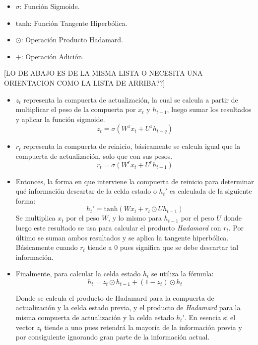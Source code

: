 \documentclass[12pt, letterpaper]{article}
\begin{document}
    \begin{itemize}
        \item $\sigma$: Función Sigmoide.
        \item $\text{tanh}$: Función Tangente Hiperbólica.
        \item $\odot$: Operación Producto Hadamard.
        \item $+$: Operación Adición. 
    \end{itemize}
    [LO DE ABAJO ES DE LA MISMA LISTA O NECESITA UNA ORIENTACION COMO LA LISTA DE ARRIBA??]
    \begin{itemize}
        \item $z_t$ representa la compuerta de actualización, la cual se calcula a partir de multiplicar el peso de la compuerta por $x_t$ y $h_{t-1}$, luego sumar los resultados y aplicar la función sigmoide.
        \begin{equation}
            z_t=\sigma(W^zx_t+U^zh_{t-q})
        \end{equation}
        \item $r_t$ representa la compuerta de reinicio, básicamente se calcula igual que la compuerta de actualización, solo que con sus pesos.
        \begin{equation}
            r_t=\sigma(W^rx_t+U^rh_{t-1})
        \end{equation}
        \item Entonces, la forma en que interviene la compuerta de reinicio para determinar qué información descartar de la celda estado o $h_t'$ es calculada de la siguiente forma:
        \begin{equation}
            h_t'=\text{tanh}(Wx_t + r_t\odot{Uh_{t-1}})
        \end{equation}
        Se multiplica $x_t$ por el peso $W$, y lo mismo para $h_{t-1}$ por el peso $U$ donde luego este resultado se usa para calcular el producto \emph{Hadamard} con $r_t$. Por último se suman ambos resultados y se aplica la tangente hiperbólica. Básicamente cuando $r_t$ tiende a $0$ pues significa que se debe descartar tal información.

        \item Finalmente, para calcular la celda estado $h_t$ se utiliza la fórmula:
        \begin{equation}
            h_t = z_t\odot{h_{t-1} + (1-z_t)\odot{h_t}}
        \end{equation}
        
        Donde se calcula el producto de Hadamard para la compuerta de actualización y la celda estado previa, y el producto de \emph{Hadamard} para la misma compuerta de actualización y la celda estado $h_t'$. En esencia si el vector $z_t$ tiende a uno pues retendrá la mayoría de la información previa y por consiguiente ignorando gran parte de la información actual\cite{Kostadinov_2019}.
    \end{itemize}
\end{document}
